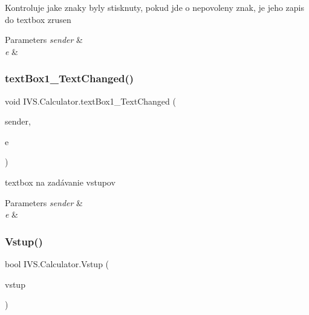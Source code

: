 Kontroluje jake znaky byly stisknuty, pokud jde o nepovoleny znak, je jeho zapis do textbox zrusen 


\begin{DoxyParams}{Parameters}
{\em sender} & \\
\hline
{\em e} & \\
\hline
\end{DoxyParams}
\mbox{\label{class_i_v_s_1_1_calculator_a5b2424094c9a7228f4b71fd9e27a79ca}} 
\subsubsection{\texorpdfstring{text\+Box1\+\_\+\+Text\+Changed()}{textBox1\_TextChanged()}}
{\footnotesize\ttfamily void I\+V\+S.\+Calculator.\+text\+Box1\+\_\+\+Text\+Changed (\begin{DoxyParamCaption}\item[{object}]{sender,  }\item[{Event\+Args}]{e }\end{DoxyParamCaption})\hspace{0.3cm}{\ttfamily [protected]}}



textbox na zadávanie vstupov 


\begin{DoxyParams}{Parameters}
{\em sender} & \\
\hline
{\em e} & \\
\hline
\end{DoxyParams}
\mbox{\label{class_i_v_s_1_1_calculator_a1f5a3ec0d3225879502a138d6ce14dec}} 
\subsubsection{\texorpdfstring{Vstup()}{Vstup()}}
{\footnotesize\ttfamily bool I\+V\+S.\+Calculator.\+Vstup (\begin{DoxyParamCaption}\item[{string}]{vstup }\end{DoxyParamCaption})\hspace{0.3cm}{\ttfamily [protected]}}



